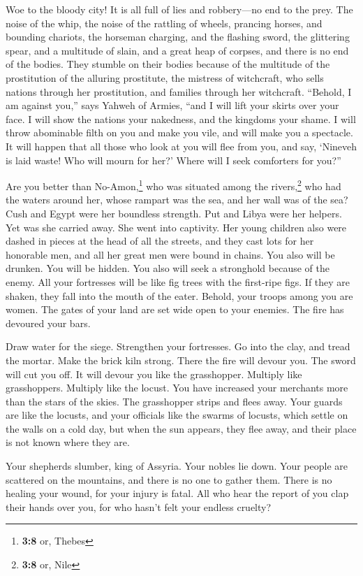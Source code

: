  Woe to the bloody city! It is all full of lies and
robbery---no end to the prey.  The noise of the whip, the
noise of the rattling of wheels, prancing horses, and bounding chariots,
 the horseman charging, and the flashing sword, the
glittering spear, and a multitude of slain, and a great heap of corpses,
and there is no end of the bodies. They stumble on their bodies
 because of the multitude of the prostitution of the
alluring prostitute, the mistress of witchcraft, who sells nations
through her prostitution, and families through her witchcraft.
 ``Behold, I am against you,'' says Yahweh of Armies,
``and I will lift your skirts over your face. I will show the nations
your nakedness, and the kingdoms your shame.  I will throw
abominable filth on you and make you vile, and will make you a
spectacle.  It will happen that all those who look at you
will flee from you, and say, `Nineveh is laid waste! Who will mourn for
her?' Where will I seek comforters for you?''

 Are you better than No-Amon,\footnote{\textbf{3:8} or,
  Thebes} who was situated among the rivers,\footnote{\textbf{3:8} or,
  Nile} who had the waters around her, whose rampart was the sea, and
her wall was of the sea?  Cush and Egypt were her
boundless strength. Put and Libya were her helpers.  Yet
was she carried away. She went into captivity. Her young children also
were dashed in pieces at the head of all the streets, and they cast lots
for her honorable men, and all her great men were bound in chains.
 You also will be drunken. You will be hidden. You also
will seek a stronghold because of the enemy.  All your
fortresses will be like fig trees with the first-ripe figs. If they are
shaken, they fall into the mouth of the eater.  Behold,
your troops among you are women. The gates of your land are set wide
open to your enemies. The fire has devoured your bars.

 Draw water for the siege. Strengthen your fortresses. Go
into the clay, and tread the mortar. Make the brick kiln strong.
 There the fire will devour you. The sword will cut you
off. It will devour you like the grasshopper. Multiply like
grasshoppers. Multiply like the locust.  You have
increased your merchants more than the stars of the skies. The
grasshopper strips and flees away.  Your guards are like
the locusts, and your officials like the swarms of locusts, which settle
on the walls on a cold day, but when the sun appears, they flee away,
and their place is not known where they are.

 Your shepherds slumber, king of Assyria. Your nobles lie
down. Your people are scattered on the mountains, and there is no one to
gather them.  There is no healing your wound, for your
injury is fatal. All who hear the report of you clap their hands over
you, for who hasn't felt your endless cruelty?
